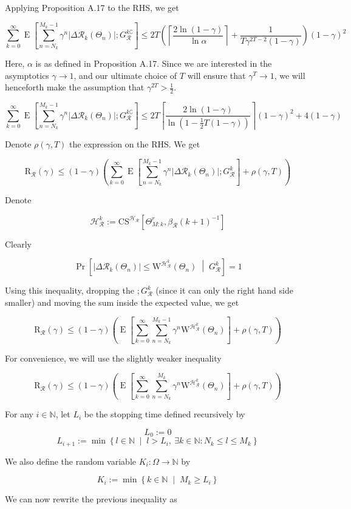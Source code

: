 \documentclass[a4paper]{article}
\newcommand{\AP}[1]{\left(#1\right)}
\newcommand{\AB}[1]{\left[#1\right]}
\newcommand{\ABM}[2]{\left[#1\;\middle\vert\;#2\right]}
\newcommand{\ACM}[2]{\left\{#1\;\middle\vert\;#2\right\}}
\newcommand{\Abs}[1]{\left\vert #1 \right\vert}
\newcommand{\Ceil}[1]{\left\lceil #1 \right\rceil}
\newcommand{\CPb}[2]{\operatorname{Pr}\ABM{#1}{#2}}
\newcommand{\E}[1]{\operatorname{E}\AB{#1}}
\newcommand{\Nats}{\mathbb{N}}
\newcommand{\R}{\mathcal{R}}
\newcommand{\Hy}{\mathcal{H}}
\newcommand{\Reg}{\mathrm{R}}
\newcommand{\ET}{N}
\newcommand{\IT}{M}
\newcommand{\CSE}{G}
\newcommand{\CS}{\mathrm{CS}}
\newcommand{\W}{\mathrm{W}}
\begin{document}
Applying Proposition A.17 to the RHS, we get

$$\sum_{k=0}^\infty\E{\sum_{n=\ET_k}^{\IT_k-1}\gamma^{n}\Abs{\Delta\R_k\AP{\Theta_n}};\CSE_\R^{k\complement}}\leq2T\AP{\Ceil{\frac{2\ln(1-\gamma)}{\ln\alpha}}+\frac{1}{T\gamma^{2T-2}(1-\gamma)}}(1-\gamma)^2$$

Here, $\alpha$ is as defined in Proposition A.17. Since we are interested in the asymptotics $\gamma\rightarrow1$, and our ultimate choice of $T$ will ensure that $\gamma^T\rightarrow1$, we will henceforth make the assumption that $\gamma^{2T}>\frac{1}{2}$.

$$\sum_{k=0}^\infty\E{\sum_{n=\ET_k}^{\IT_k-1}\gamma^{n}\Abs{\Delta\R_k\AP{\Theta_n}};\CSE_\R^{k\complement}}\leq2T\Ceil{\frac{2\ln(1-\gamma)}{\ln\AP{1-\frac{1}{2}T(1-\gamma)}}}(1-\gamma)^2+4(1-\gamma)$$

Denote $\rho(\gamma,T)$ the expression on the RHS. We get

$$\Reg_\R(\gamma)\leq(1-\gamma)\AP{\sum_{k=0}^\infty\E{\sum_{n=\ET_k}^{\IT_k-1}\gamma^{n}\Abs{\Delta\R_k\AP{\Theta_n}};\CSE_\R^k}+\rho(\gamma,T)}$$

Denote

$$\Hy_\R^k:=\CS^{\Hy_\R}\AB{\Theta_{M:k}^r,\beta_\R(k+1)^{-1}}$$

Clearly

$$\CPb{\Abs{\Delta\R_k\AP{\Theta_n}}\leq\W^{\Hy_\R^k}\AP{\Theta_n}}{\CSE_\R^k}=1$$

Using this inequality, dropping the $;G_\R^k$ (since it can only the right hand side smaller) and moving the sum inside the expected value, we get

$$\Reg_\R(\gamma)\leq(1-\gamma)\AP{\E{\sum_{k=0}^\infty\sum_{n=\ET_k}^{\IT_k-1}\gamma^{n}\W^{\Hy_\R^k}\AP{\Theta_n}}+\rho(\gamma,T)}$$

For convenience, we will use the slightly weaker inequality

$$\Reg_\R(\gamma)\leq(1-\gamma)\AP{\E{\sum_{k=0}^\infty\sum_{n=\ET_k}^{\IT_k}\gamma^{n}\W^{\Hy_\R^k}\AP{\Theta_n}}+\rho(\gamma,T)}$$

For any $i\in\Nats$, let $L_i$ be the stopping time defined recursively by

$$L_0:=0$$
$$L_{i+1}:=\min\ACM{l\in\Nats}{l>L_i,\ \exists k\in\Nats:\ET_k\leq l \leq \IT_k}$$

We also define the random variable $K_i:\Omega\rightarrow\Nats$ by

$$K_i:=\min\ACM{k\in\Nats}{\IT_k\geq L_i}$$

We can now rewrite the previous inequality as
\end{document}
